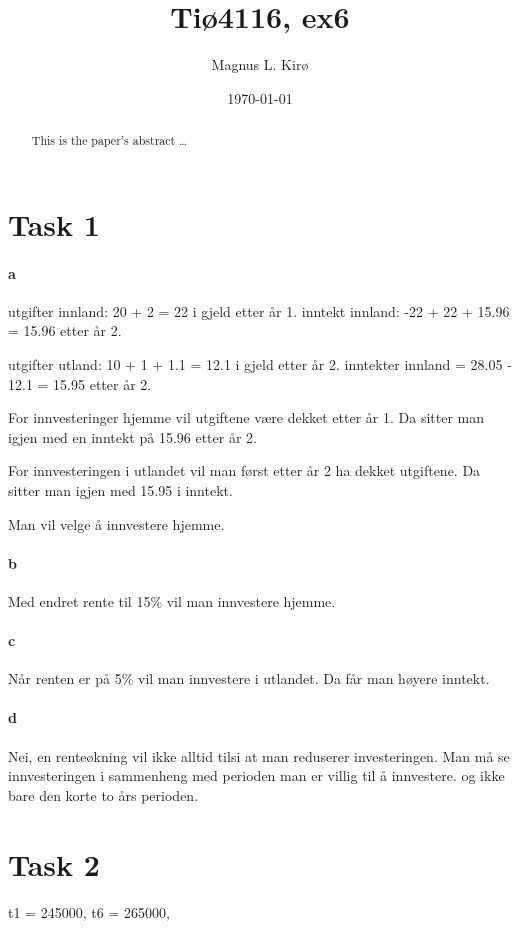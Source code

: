\documentclass[12pt, a4paper]{article}
\title{
	Tiø4116, ex6
}
\author{
	Magnus L. Kirø \\
}
\date{\today}
\begin{document}
\maketitle
{}

\begin{abstract}
This is the paper's abstract \ldots
\end{abstract}

\section{Task 1}
\paragraph{a}
utgifter innland: 20 + 2 = 22 i gjeld etter år 1.
inntekt innland: -22 + 22 + 15.96 = 15.96 etter år 2.

utgifter utland: 10 + 1 + 1.1 = 12.1 i gjeld etter år 2.
inntekter innland = 28.05 - 12.1 = 15.95 etter år 2.

For innvesteringer hjemme vil utgiftene være dekket etter år 1. Da sitter man
igjen med en inntekt på 15.96 etter år 2.

For innvesteringen i utlandet vil man først etter år 2 ha dekket utgiftene. Da
sitter man igjen med 15.95 i inntekt. 

Man vil velge å innvestere hjemme. 

\paragraph{b}
Med endret rente til 15\% vil man innvestere hjemme.

\paragraph{c}
Når renten er på 5\% vil man innvestere i utlandet. Da får man høyere inntekt. 

\paragraph{d}
Nei, en renteøkning vil ikke alltid tilsi at man reduserer investeringen.
Man må se innvesteringen i sammenheng med perioden man er villig til å
innvestere. og ikke bare den korte to års perioden. 


\section{Task 2}
t1 = 245000, 
t6 = 265000,
\end{document}
